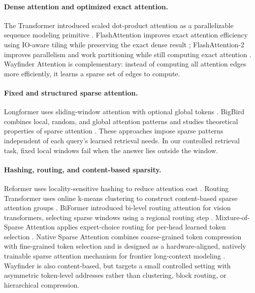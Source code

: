 \documentclass{article}
\begin{document}
\paragraph{Dense attention and optimized exact attention.}
The Transformer introduced scaled dot-product attention as a parallelizable sequence modeling primitive \cite{vaswani2017attention}. FlashAttention improves exact attention efficiency using IO-aware tiling while preserving the exact dense result \cite{dao2022flashattention}; FlashAttention-2 improves parallelism and work partitioning while still computing exact attention \cite{dao2024flashattention2}. Wayfinder Attention is complementary: instead of computing all attention edges more efficiently, it learns a sparse set of edges to compute.

\paragraph{Fixed and structured sparse attention.}
Longformer uses sliding-window attention with optional global tokens \cite{beltagy2020longformer}. BigBird combines local, random, and global attention patterns and studies theoretical properties of sparse attention \cite{zaheer2020bigbird}. These approaches impose sparse patterns independent of each query's learned retrieval needs. In our controlled retrieval task, fixed local windows fail when the answer lies outside the window.

\paragraph{Hashing, routing, and content-based sparsity.}
Reformer uses locality-sensitive hashing to reduce attention cost \cite{kitaev2020reformer}. Routing Transformer uses online k-means clustering to construct content-based sparse attention groups \cite{roy2021routing}. BiFormer introduced bi-level routing attention for vision transformers, selecting sparse windows using a regional routing step \cite{zhu2023biformer}. Mixture-of-Sparse Attention applies expert-choice routing for per-head learned token selection \cite{piekos2025mosa}. Native Sparse Attention combines coarse-grained token compression with fine-grained token selection and is designed as a hardware-aligned, natively trainable sparse attention mechanism for frontier long-context modeling \cite{yuan2025nsa}. Wayfinder is also content-based, but targets a small controlled setting with asymmetric token-level addresses rather than clustering, block routing, or hierarchical compression.
\end{document}
